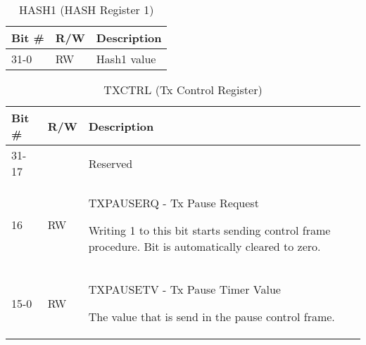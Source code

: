 \begin{table}[H]
  \centering
  \begin{tabularx}{\textwidth}{|l|l|X|}
    
    \hline
    \rowcolor{iob-green}
    {\bf Bit \#} & {\bf R/W} & {\bf Description} \\ \hline

    31-0   & RW  & Hash1 value \\ \hline
  \end{tabularx}
    \caption{HASH1 (HASH Register 1)}
  \label{swreg_details:hash1}
\end{table}

\begin{table}[H]
  \centering
  \begin{tabularx}{\textwidth}{|l|l|X|}
    
    \hline
    \rowcolor{iob-green}
    {\bf Bit \#} & {\bf R/W} & {\bf Description} \\ \hline

    31-17   &   & Reserved \\ \hline
    \rowcolor{iob-blue}
    16      & RW & TXPAUSERQ - Tx Pause Request

                Writing 1 to this bit starts sending control frame procedure.
                Bit is automatically cleared to zero. \\ \hline
    15-0    & RW & TXPAUSETV - Tx Pause Timer Value

                 The value that is send in the pause control frame.\\ \hline
  \end{tabularx}
    \caption{TXCTRL (Tx Control Register)}
  \label{swreg_details:txctrl}
\end{table}
